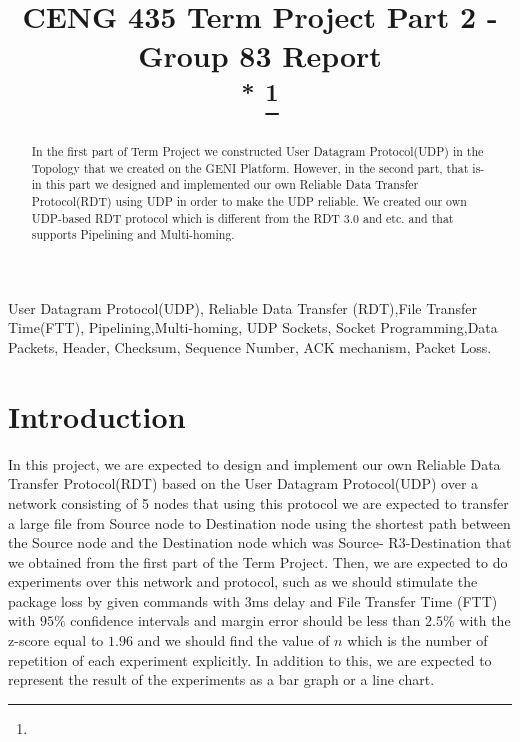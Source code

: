 \documentclass[conference]{IEEEtran}
\begin{document}
\title{CENG 435 Term Project Part 2 - Group 83 Report\\
{\footnotesize \textsuperscript{*}}
\thanks{}
}
\author{
\and
{}
}

\maketitle

\begin{abstract}
In the first part of Term Project we constructed User Datagram Protocol(UDP) in the Topology that we created on the GENI Platform. However, in the second part, that is-in this part we designed and implemented our own Reliable Data Transfer Protocol(RDT) using UDP in order to make the UDP reliable. We created our own UDP-based RDT protocol which is different from the RDT 3.0 and etc. and that supports Pipelining and Multi-homing.  
\end{abstract}

\begin{IEEEkeywords}
User Datagram Protocol(UDP), Reliable Data Transfer (RDT),File Transfer Time(FTT), Pipelining,Multi-homing, UDP Sockets, Socket Programming,Data Packets, Header,  Checksum, Sequence Number, ACK mechanism, Packet Loss.
\end{IEEEkeywords}

\section{Introduction}
In this project, we are expected to design and implement our own Reliable Data Transfer Protocol(RDT) based on the User Datagram Protocol(UDP) over a network consisting of 5 nodes that using this protocol we are expected to transfer a large file from Source node to Destination node using the shortest path between the Source node and the Destination node which was Source- R3-Destination that we obtained from the first part of the Term Project. Then, we are expected to do experiments over this network and protocol, such as we should stimulate the package loss by given commands with 3ms delay and File Transfer Time (FTT) with $95\%$ confidence intervals and margin error should be less than $2.5\%$ with the z-score equal to $1.96$ and we should find the value of $n$ which is the number of repetition of each experiment explicitly. In addition to this, we are expected to represent the result of the experiments as a bar graph or a line chart.
\end{document}
